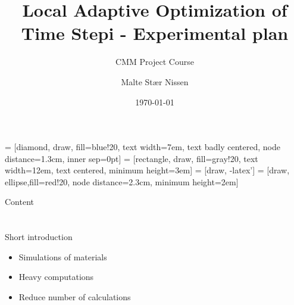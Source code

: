 \usepackage{pslatex}
\usepackage{listing}
\usepackage{caption}
\usepackage{subcaption}
\usepackage{multirow}

\usepackage{etoolbox}%

\usepackage{tikz}
\usetikzlibrary{shapes,arrows}


\usepackage{scalefnt}



\title{Local Adaptive Optimization of Time Stepi - Experimental plan}
\subtitle{CMM Project Course}
\author{Malte Stær Nissen}
\date{\today}



 = [diamond, draw, fill=blue!20, 
    text width=7em, text badly centered, node distance=1.3cm, inner sep=0pt]
 = [rectangle, draw, fill=gray!20, 
    text width=12em, text centered, minimum height=3em]
 = [draw, -latex']
 = [draw, ellipse,fill=red!20, node distance=2.3cm, minimum height=2em]

\frame[plain]{\titlepage}

\begin{frame}{Content}
	\begin{center}
	\end{center}
\end{frame}

\section{}
\begin{frame}{Short introduction}
	\begin{itemize}
		\item Simulations of materials
		\item Heavy computations
        \item Reduce number of calculations
	\end{itemize}
\end{frame}


